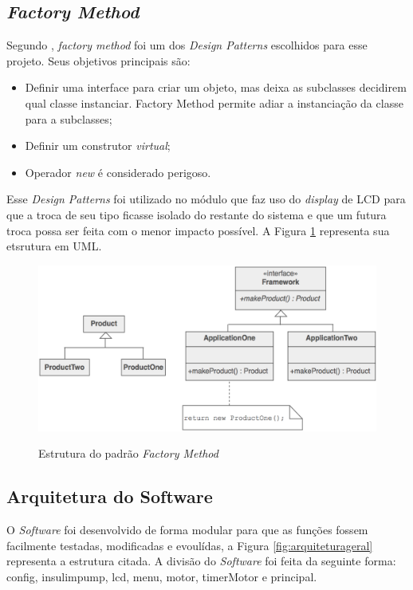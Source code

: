 \subsection{\emph{Factory Method}}
Segundo \cite{shalloway2004design}, \emph{factory method} foi um dos \emph{Design Patterns} escolhidos para esse projeto. Seus objetivos principais são:

\begin{itemize}
\item Definir uma interface para criar um objeto, mas deixa as subclasses decidirem qual classe instanciar. Factory Method permite adiar a instanciação da classe para a subclasses;
\item Definir um construtor \emph{virtual};
\item Operador \emph{new} é considerado perigoso.
\end{itemize}

Esse \emph{Design Patterns} foi utilizado no módulo que faz uso do \emph{display} de LCD para que a troca de seu tipo ficasse isolado do restante do sistema e que um futura troca possa ser feita com o menor impacto possível. A Figura \ref{fig:factorymethod} representa sua etsrutura em UML. \newpage

\begin{figure}[htp]
	\centering
	\includegraphics[scale=0.4]{images/Factory_Method.png}
	\caption{Estrutura do padrão \emph{Factory Method}}	
	\label{fig:factorymethod}
	\cite{shalloway2004design}
\end{figure}

\subsection{Arquitetura do Software}

O \emph{Software} foi desenvolvido de forma modular para que as funções fossem facilmente testadas, modificadas e evoulídas, a Figura \ref{fig:arquiteturageral} representa a estrutura citada. A divisão do \emph{Software} foi feita da seguinte forma: config, insulimpump, lcd, menu, motor, timerMotor e principal. 

